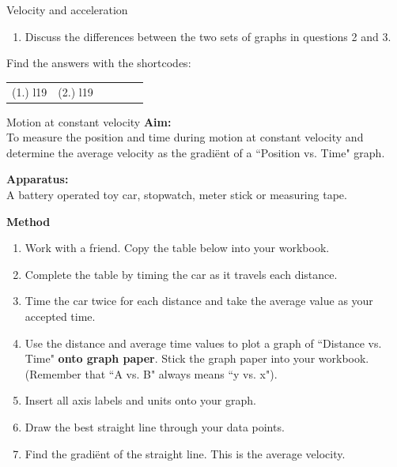 \begin{exercises}{Velocity and acceleration }
\begin{enumerate}[noitemsep, label=\textbf{\arabic*}. ]
\begin{enumerate}[noitemsep, label=\textbf{\alph*}. ]
\label{m38795*uid100}\item Discuss the differences between the two sets of graphs in questions 2 and 3.\end{enumerate}
        \end{enumerate}
\label{m38795*secfhsst!!!underscore!!!id2603}
\par {} Find the answers with the shortcodes:
 \par \begin{tabular}[h]{cccccc}
 (1.) l19  &  (2.) l19  & \end{tabular}
\end{exercises}
\begin{g_experiment}{Motion at constant velocity }
            \nopagebreak
\textbf{Aim:}\\
To measure the position and time during motion at constant velocity and determine the average velocity as the gradi\"ent of a ``Position vs. Time" graph.\par 
        \label{m38795*id71286}\noindent{}\textbf{Apparatus:}\\
 A battery operated toy car, stopwatch, meter stick or measuring tape.\par 
        \label{m38795*id71301}\noindent{}\textbf{Method}\\
        \label{m38795*id71310}\begin{enumerate}[noitemsep, label=\textbf{\arabic*}. ] 
            \label{m38795*uid101}\item Work with a friend. Copy the table below into your workbook.
\label{m38795*uid102}\item Complete the table by timing the car as it travels each distance.
\label{m38795*uid103}\item Time the car twice for each distance and take the average value as your accepted time.
\label{m38795*uid104}\item Use the distance and average time values to plot a graph of ``Distance vs. Time" \textbf{onto graph paper}. Stick the graph paper into your workbook. (Remember that ``A vs. B" always means ``y vs. x").
\label{m38795*uid105}\item Insert all axis labels and units onto your graph.
\label{m38795*uid106}\item Draw the best straight line through your data points.
\label{m38795*uid107}\item Find the gradi\"ent of the straight line. This is the average velocity.

\end{enumerate}
\end{g_experiment}

